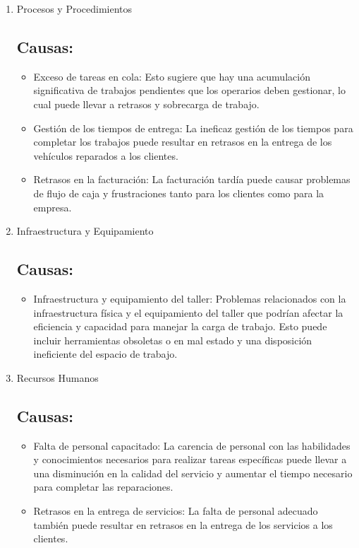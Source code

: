 \begin{enumerate}
    \item Procesos y Procedimientos
    \subsection{Causas:}
    \begin{itemize}
        \item Exceso de tareas en cola: Esto sugiere que hay una acumulación significativa de trabajos pendientes que los operarios deben gestionar, lo cual puede llevar a retrasos y sobrecarga de trabajo.
        \item Gestión de los tiempos de entrega: La ineficaz gestión de los tiempos para completar los trabajos puede resultar en retrasos en la entrega de los vehículos reparados a los clientes.
        \item Retrasos en la facturación: La facturación tardía puede causar problemas de flujo de caja y frustraciones tanto para los clientes como para la empresa.
    \end{itemize}


    \item Infraestructura y Equipamiento
    \subsection{Causas:}
    \begin{itemize}
        \item Infraestructura y equipamiento del taller: Problemas relacionados con la infraestructura física y el equipamiento del taller que podrían afectar la eficiencia y capacidad para manejar la carga de trabajo. Esto puede incluir herramientas obsoletas o en mal estado y una disposición ineficiente del espacio de trabajo.
    \end{itemize}

    \item Recursos Humanos
    \subsection{Causas:}
    \begin{itemize}
        \item Falta de personal capacitado: La carencia de personal con las habilidades y conocimientos necesarios para realizar tareas específicas puede llevar a una disminución en la calidad del servicio y aumentar el tiempo necesario para completar las reparaciones.
        \item Retrasos en la entrega de servicios: La falta de personal adecuado también puede resultar en retrasos en la entrega de los servicios a los clientes.
    \end{itemize}



\end{enumerate}
